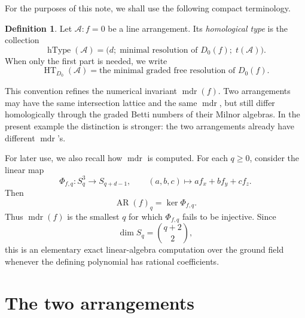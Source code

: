 \documentclass[11pt]{amsart}
\newcommand{\cA}{\mathcal A}
\newcommand{\AR}{\operatorname{AR}}
\newcommand{\mdr}{\operatorname{mdr}}
\newcommand{\HT}{\operatorname{HT}}
\newcommand{\hType}{\operatorname{hType}}
\theoremstyle{plain}
\theoremstyle{definition}
\newtheorem{definition}[theorem]{Definition}
\numberwithin{equation}{section}
\begin{document}
For the purposes of this note, we shall use the following compact terminology.

\begin{definition}\label{def:homological-type}
Let \(\cA:f=0\) be a line arrangement.  Its \emph{homological type} is the collection
\[
\hType(\cA)=\bigl(d;\; \text{minimal resolution of }D_0(f);\; t(\cA)\bigr).
\]
When only the first part is needed, we write
\[
\HT_{D_0}(\cA)=\text{the minimal graded free resolution of }D_0(f).
\]
\end{definition}

This convention refines the numerical invariant \(\mdr(f)\).  Two arrangements may have the same intersection lattice and the same \(\mdr\), but still differ homologically through the graded Betti numbers of their Milnor algebras.  In the present example the distinction is stronger: the two arrangements already have different \(\mdr\)'s.

For later use, we also recall how \(\mdr\) is computed.  For each \(q\geq0\), consider the linear map
\begin{equation}\label{eq:Phi-map}
\Phi_{f,q}:S_q^3\longrightarrow S_{q+d-1},
\qquad
(a,b,c)\longmapsto a f_x+b f_y+c f_z.
\end{equation}
Then
\[
\AR(f)_q=\ker \Phi_{f,q}.
\]
Thus \(\mdr(f)\) is the smallest \(q\) for which \(\Phi_{f,q}\) fails to be injective.  Since
\[
\dim S_q=\binom{q+2}{2},
\]
this is an elementary exact linear-algebra computation over the ground field whenever the defining polynomial has rational coefficients.

\section{The two arrangements}
\end{document}
